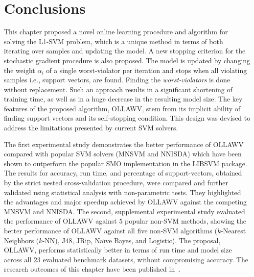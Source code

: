 \documentclass[reqno]{vcuthesis}
\numberwithin{equation}{chapter}
\begin{document}
\section{Conclusions}\label{sec:ollawvconclusion}
This chapter proposed a novel online learning procedure and algorithm for solving the L1-SVM problem, which is a unique method in terms of both iterating over samples and updating the model. A new stopping criterion for the stochastic gradient procedure is also proposed. The model is updated by changing the weight $\alpha_i$ of a single worst-violator per iteration and stops when all violating samples i.e., support vectors, are found. Finding the \textit{worst-violators} is done without replacement. Such an approach results in a significant shortening of training time, as well as in a huge decrease in the resulting model size. The key features of the proposed algorithm, OLLAWV, stem from its implicit ability of finding support vectors and its self-stopping condition. This design was devised to address the limitations presented by current SVM solvers. 

The first experimental study demonstrates the better performance of OLLAWV compared with popular SVM solvers (MNSVM and NNISDA) which have been shown to outperform the popular SMO implementation in the LIBSVM package. The results for accuracy, run time, and percentage of support-vectors, obtained by the strict nested cross-validation procedure, were compared and further validated using statistical analysis with non-parametric tests. They highlighted the advantages and major speedup achieved by OLLAWV against the competing MNSVM and NNISDA. The second, supplemental experimental study evaluated the performance of OLLAWV against $5$ popular non-SVM methods, showing the better performance of OLLAWV against all five non-SVM algorithms ($k$-Nearest Neighbors ($k$-NN), J48, JRip, Na\"ive Bayes, and Logistic). The proposal, OLLAWV, performs statistically better in terms of run time and model size across all $23$ evaluated benchmark datasets, without compromising accuracy. The research outcomes of this chapter have been published in~\cite{melki2018ollawv}.
\end{document}
